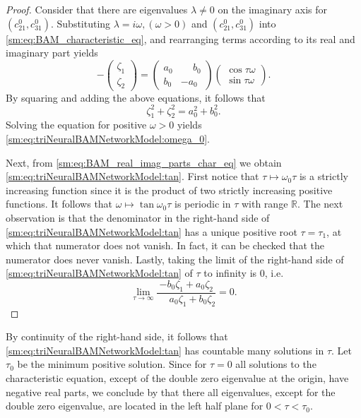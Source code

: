 \begin{proof}
Consider that there are eigenvalues $\lambda\neq0$ on the imaginary
axis for $(c_{21}^{0},c_{31}^{0})$. Substituting $\lambda=i\omega,(\omega>0)$
and $(c_{21}^{0},c_{31}^{0})$ into \cref{sm:eq:BAM_characteristic_eq},
and rearranging terms according to its real and imaginary part yields
\begin{equation}
\label{sm:eq:BAM_real_imag_parts_char_eq}
-\begin{pmatrix}
    \zeta_1 \\
    \zeta_2 
\end{pmatrix}
=
\begin{pmatrix}
    a_0 & \phantom{-}b_0 \\
    b_0 & -a_0
\end{pmatrix}
\begin{pmatrix}
\cos\tau\omega \\
\sin\tau\omega
\end{pmatrix}.
\end{equation}
By squaring and adding the above equations, it follows that
\begin{equation}
    \label{sm:eq:BAM_omega}
    \zeta_1^2 + \zeta_2^2 = a_0^2 + b_0^2.
\end{equation}
Solving the equation for positive $\omega>0$ yields \cref{sm:eq:triNeuralBAMNetworkModel:omega_0}.

Next, from \cref{sm:eq:BAM_real_imag_parts_char_eq} we obtain \cref{sm:eq:triNeuralBAMNetworkModel:tan}.
First notice that $\tau \mapsto \omega_0 \tau$ is a strictly increasing
function since it is the product of two strictly increasing positive functions.
It follows that $\omega \mapsto \tan \omega_0 \tau$ is periodic in $\tau$ with
range $\mathbb R$. The next observation is that the denominator in the right-hand
side of \cref{sm:eq:triNeuralBAMNetworkModel:tan} has a unique positive root $\tau=\tau_1$, at which
that numerator does not vanish. In fact, it can be checked that the numerator
does never vanish. Lastly, taking the limit of the right-hand side of
\cref{sm:eq:triNeuralBAMNetworkModel:tan} of $\tau$ to infinity is $0$, i.e.
\[
    \lim_{\tau \rightarrow \infty} \frac{-b_0\zeta_1 + a_0\zeta_2}{\phantom{-}a_0\zeta_1 + b_0\zeta_2} = 0.
\]
\end{proof}
By continuity of the right-hand side, it follows that \cref{sm:eq:triNeuralBAMNetworkModel:tan} has
countable many solutions in $\tau$. Let $\tau_0$ be the minimum positive 
solution. Since for $\tau=0$ all solutions to the characteristic equation, except
of the double zero eigenvalue at the origin, have negative real parts,
we conclude by \cite[Corollary 2.3]{Ruan@2001} that
there all eigenvalues, except for the double zero eigenvalue, are located
in the left half plane for $0 < \tau < \tau_0$.

